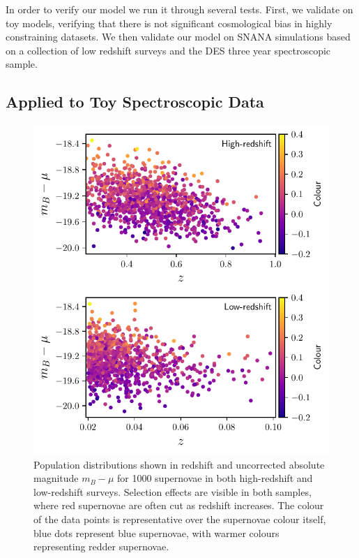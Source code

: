 \documentclass[a4paper,fleqn,usenatbib]{mnras}
\begin{document}
In order to verify our model we run it through several tests. First, we validate on toy models, verifying that there is not significant cosmological bias in highly constraining datasets. We then validate our model on SNANA simulations based on a collection of low redshift surveys and the DES three year spectroscopic sample.

\subsection{Applied to Toy Spectroscopic Data}
\label{sec:toy}


\begin{figure}
	\begin{center}
		\includegraphics[width=\columnwidth]{plot_pop_simple.pdf}
	\end{center}
	\caption{Population distributions shown in redshift and uncorrected absolute magnitude $m_B - \mu$ for 1000 supernovae in both high-redshift and low-redshift surveys. Selection effects are visible in both samples, where red supernovae are often cut as redshift increases. The colour of the data points is representative over the supernovae colour itself, blue dots represent blue supernovae, with warmer colours representing redder supernovae.}
	\label{fig:simple_pop}
\end{figure}
\end{document}
